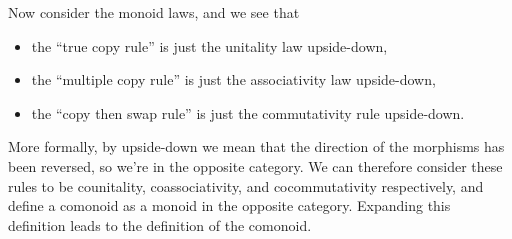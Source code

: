 \documentclass[fleqn]{NotesClass}
\begin{document}
    Now consider the monoid laws, and we see that
    \begin{itemize}
        \item the \enquote{true copy rule} is just the unitality law upside-down,
        \item the \enquote{multiple copy rule} is just the associativity law upside-down,
        \item the \enquote{copy then swap rule} is just the commutativity rule upside-down.
    \end{itemize}
    More formally, by upside-down we mean that the direction of the morphisms has been reversed, so we're in the opposite category.
    We can therefore consider these rules to be counitality, coassociativity, and cocommutativity respectively, and define a comonoid as a monoid in the opposite category.
    Expanding this definition leads to the definition of the comonoid.
    
\end{document}
